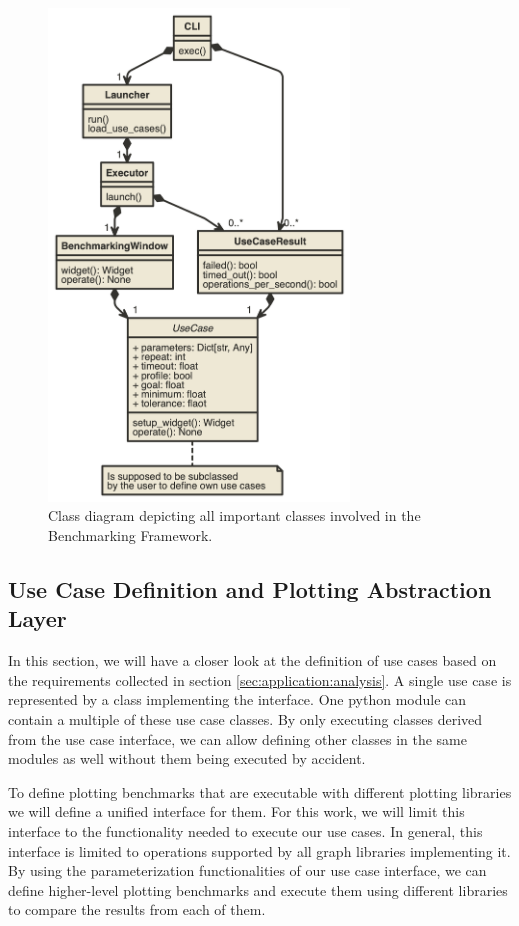 \begin{figure}[h]
    \centering
    \includegraphics[width=8cm]{resources/img/class/widgetmark}
    \caption{
        Class diagram depicting all important classes involved in the
        Benchmarking Framework. 
    }
    \label{fig:application:design:classdiagram:widgetmark}
\end{figure}

\clearpage

\subsection{Use Case Definition and Plotting Abstraction Layer}

\label{sec:application:design:usecases}

In this section, we will have a closer look at the definition of use cases based on
the requirements collected in section \ref{sec:application:analysis}. A
single use case is represented by a class implementing the
 interface. One python module can contain a multiple
of these use case classes. By only executing classes derived from the use case
interface, we can allow defining other classes in the same modules as well
without them being executed by accident.

To define plotting benchmarks that are executable with different plotting
libraries we will define a unified interface for them. For this
work, we will limit this interface to the functionality needed to execute our
use cases. In general, this interface is limited to operations supported by all
graph libraries implementing it. By using the parameterization functionalities
of our use case interface, we can define higher-level plotting benchmarks and
execute them using different libraries to compare the results from each of them.

